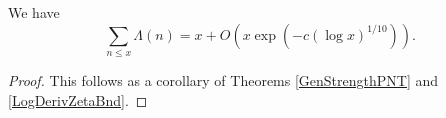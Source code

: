 \begin{theorem}[MediumPNT]
\label{MediumPNT}
\leanok
We have
    $$\sum_{n \leq x}\Lambda(n)=x+O(x \exp(-c(\log x)^{1/10})).$$
\end{theorem}
\begin{proof}
\leanok
This follows as a corollary of Theorems \ref{GenStrengthPNT} and \ref{LogDerivZetaBnd}.
\end{proof}
